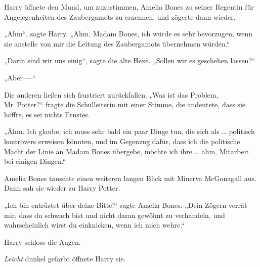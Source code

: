 Harry öffnete den Mund, um zuzustimmen, Amelia Bones zu seiner Regentin für Angelegenheiten des Zaubergamots zu ernennen, und zögerte dann wieder.

„Ähm“, sagte Harry. „Ähm. Madam Bones, ich würde es sehr bevorzugen, wenn sie anstelle von mir die Leitung des Zaubergamots übernehmen würden.“

„Darin sind wir uns einig“, sagte die alte Hexe.
„Sollen wir es geschehen lassen?“

„Aber —“

Die anderen ließen sich frustriert zurückfallen.
„Was ist das Problem, Mr~Potter?“ fragte die Schulleiterin mit einer Stimme, die andeutete, dass sie hoffte, es sei nichts Ernstes.

„Ähm. Ich glaube, ich muss sehr bald ein paar Dinge tun, die sich als … politisch kontrovers erweisen könnten, und im Gegenzug dafür, dass ich die politische Macht der Linie an Madam Bones übergebe, möchte ich ihre … ähm, Mitarbeit bei einigen Dingen.“

Amelia Bones tauschte einen weiteren langen Blick mit Minerva McGonagall aus. Dann sah sie wieder zu Harry Potter.

„Ich bin entrüstet über deine Bitte!“ sagte Amelia Bones.
„Dein Zögern verrät mir, dass du schwach bist und nicht daran gewöhnt zu verhandeln, und wahrscheinlich wirst du einknicken, wenn ich mich wehre.“

Harry schloss die Augen.

\emph{Leicht} dunkel gefärbt öffnete Harry sie.

